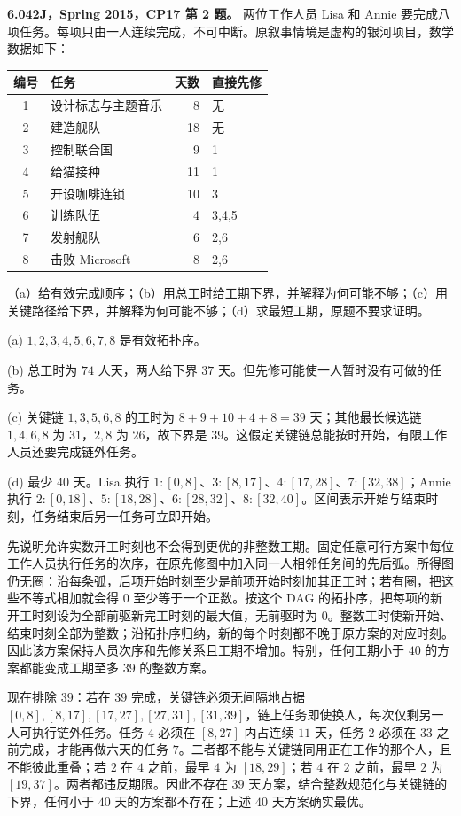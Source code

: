 \begin{exercise}\label{mit:6042-cp17-q2}
\textbf{6.042J，Spring 2015，CP17 第 2 题。}
两位工作人员 Lisa 和 Annie 要完成八项任务。每项只由一人连续完成，不可中断。原叙事情境是虚构的银河项目，数学数据如下：
\begin{center}
\begin{tabular}{c|l|r|l}
编号&任务&天数&直接先修\\\hline
1&设计标志与主题音乐&8&无\\2&建造舰队&18&无\\3&控制联合国&9&1\\
4&给猫接种&11&1\\5&开设咖啡连锁&10&3\\6&训练队伍&4&3,4,5\\
7&发射舰队&6&2,6\\8&击败 Microsoft&8&2,6
\end{tabular}
\end{center}
（a）给有效完成顺序；（b）用总工时给工期下界，并解释为何可能不够；（c）用关键路径给下界，并解释为何可能不够；（d）求最短工期，原题不要求证明。
\end{exercise}
\begin{solution}
(a) $1,2,3,4,5,6,7,8$ 是有效拓扑序。

(b) 总工时为 $74$ 人天，两人给下界 $37$ 天。但先修可能使一人暂时没有可做的任务。

(c) 关键链 $1,3,5,6,8$ 的工时为 $8+9+10+4+8=39$ 天；其他最长候选链 $1,4,6,8$ 为 $31$，$2,8$ 为 $26$，故下界是 $39$。这假定关键链总能按时开始，有限工作人员还要完成链外任务。

(d) 最少 $40$ 天。Lisa 执行 $1:[0,8]$、$3:[8,17]$、$4:[17,28]$、$7:[32,38]$；Annie 执行 $2:[0,18]$、$5:[18,28]$、$6:[28,32]$、$8:[32,40]$。区间表示开始与结束时刻，任务结束后另一任务可立即开始。

先说明允许实数开工时刻也不会得到更优的非整数工期。固定任意可行方案中每位工作人员执行任务的次序，在原先修图中加入同一人相邻任务间的先后弧。所得图仍无圈：沿每条弧，后项开始时刻至少是前项开始时刻加其正工时；若有圈，把这些不等式相加就会得 $0$ 至少等于一个正数。按这个 DAG 的拓扑序，把每项的新开工时刻设为全部前驱新完工时刻的最大值，无前驱时为 $0$。整数工时使新开始、结束时刻全部为整数；沿拓扑序归纳，新的每个时刻都不晚于原方案的对应时刻。因此该方案保持人员次序和先修关系且工期不增加。特别，任何工期小于 $40$ 的方案都能变成工期至多 $39$ 的整数方案。

现在排除 $39$：若在 $39$ 完成，关键链必须无间隔地占据 $[0,8],[8,17],[17,27],[27,31],[31,39]$，链上任务即使换人，每次仅剩另一人可执行链外任务。任务 $4$ 必须在 $[8,27]$ 内占连续 $11$ 天，任务 $2$ 必须在 $33$ 之前完成，才能再做六天的任务 $7$。二者都不能与关键链同用正在工作的那个人，且不能彼此重叠；若 $2$ 在 $4$ 之前，最早 $4$ 为 $[18,29]$；若 $4$ 在 $2$ 之前，最早 $2$ 为 $[19,37]$。两者都违反期限。因此不存在 $39$ 天方案，结合整数规范化与关键链的下界，任何小于 $40$ 天的方案都不存在；上述 $40$ 天方案确实最优。
\end{solution}

